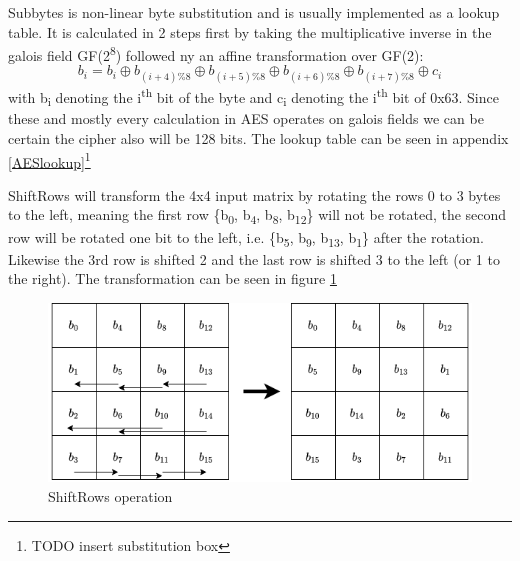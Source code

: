 \documentclass[a4paper]{article}
\begin{document}
Subbytes is non-linear byte substitution and is usually implemented as a lookup table. It is calculated in 2 steps first by taking the multiplicative inverse in the galois field GF(2\textsuperscript{8}) followed ny an affine transformation over GF(2):
\[b_i = b_i \oplus b_{(i+4) \% 8} \oplus b_{(i+5) \% 8} \oplus b_{(i+6) \% 8} \oplus b_{(i+7) \% 8} \oplus c_i \] with b\textsubscript{i} denoting the i\textsuperscript{th} bit of the byte and c\textsubscript{i} denoting the i\textsuperscript{th} bit of 0x63. Since these and mostly every calculation in AES operates on galois fields we can be certain the cipher also will be 128 bits. The lookup table can be seen in appendix \ref{AESlookup}\footnote{TODO insert substitution box}

ShiftRows will transform the 4x4 input matrix by rotating the rows 0 to 3 bytes to the left, meaning the first row \{b\textsubscript{0}, b\textsubscript{4}, b\textsubscript{8}, b\textsubscript{12}\} will not be rotated, the second row will be rotated one bit to the left, i.e. \{b\textsubscript{5}, b\textsubscript{9}, b\textsubscript{13}, b\textsubscript{1}\} after the rotation. Likewise the 3rd row is shifted 2 and the last row is shifted 3 to the left (or 1 to the right). The transformation can be seen in figure \ref{fig:ShiftRows}


\begin{figure}[htbp]
\centering
\includegraphics[width=.9\linewidth]{./Background/shiftRows.png}
\caption{\label{fig:ShiftRows}ShiftRows operation}
\end{figure}
\end{document}
